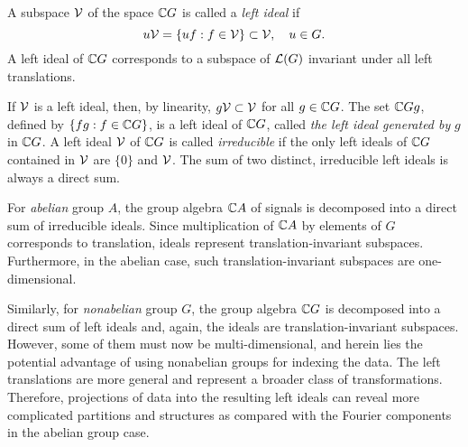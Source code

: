 A subspace $\mathcal{V}$ of the space $\mathbb{C} G$ is called a
\emph{left ideal} if 
\begin{equation}
u\mathcal{V} = \{uf : f \in \mathcal{V}\} \subset \mathcal{V}, \quad u \in G. 
\end{equation}
A left ideal of $\mathbb{C} G$ corresponds to a subspace of $\mathcal{L}(G)$
invariant under all left translations.  

If $\mathcal{V}$ is a
left ideal, then, by linearity, 
$g\mathcal{V} \subset \mathcal{V}$ for all $g \in \mathbb{C} G$.
The set $\mathbb{C} G g$, defined by 
$\{fg : f \in \mathbb{C} G\}$, is a left ideal of $\mathbb{C} G$,
called \emph{the left ideal generated by} $g$ in $\mathbb{C} G$. 
A left ideal $\mathcal{V}$ of $\mathbb{C} G$ is called \emph{irreducible}
if the only left ideals of $\mathbb{C} G$ contained in $\mathcal{V}$ are
$\{0\}$ and $\mathcal{V}$. The sum of two distinct, irreducible
left ideals is always a direct sum. 

For \emph{abelian} group $A$, the group algebra $\mathbb{C} A$ of
signals is decomposed into a direct sum of irreducible ideals.  
Since multiplication of $\mathbb{C} A$ by elements of $G$
corresponds to translation, ideals represent
translation-invariant subspaces.  Furthermore, in the 
abelian case, such translation-invariant subspaces are
one-dimensional.   

Similarly, for \emph{nonabelian} group $G$, the group algebra
$\mathbb{C} G$ is decomposed into a direct sum of left ideals
and, again, the ideals are translation-invariant
subspaces.  However, some of them must now be multi-dimensional,
and herein lies the potential advantage of using nonabelian
groups for indexing the data. The left translations
are more general and represent a broader class of 
transformations. Therefore, projections of data into the
resulting left ideals can reveal more complicated partitions
and structures as compared with the Fourier components in
the abelian group case. 

